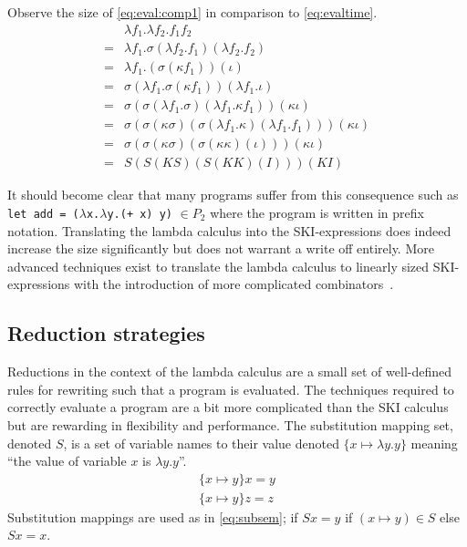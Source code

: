 \documentclass[11pt,oneside,a4paper]{report}
\begin{document}
\begin{exmp}
    Observe the size of \autoref{eq:eval:comp1} in comparison to \autoref{eq:evaltime}.
\begin{align}
    &\lambda f_1 . \lambda f_2 . f_1 f_2 \label{eq:eval:comp1}\\
    =&\lambda f_1 . \sigma(\lambda f_2 . f_1)(\lambda f_2 . f_2) \tag*{} \\
    =&\lambda f_1 . (\sigma(\kappa f_1))(\iota) \tag*{} \\
    =&\sigma (\lambda f_1 . \sigma (\kappa f_1)) (\lambda f_1 . \iota) \tag*{} \\
    =&\sigma (\sigma (\lambda f_1 . \sigma) (\lambda f_1 . \kappa f_1)) (\kappa \iota) \tag*{} \\
    =&\sigma (\sigma (\kappa \sigma) (\sigma (\lambda f_1 . \kappa) (\lambda f_1 . f_1))) (\kappa \iota) \tag*{} \\
    =&\sigma (\sigma (\kappa \sigma) (\sigma (\kappa \kappa) (\iota))) (\kappa \iota) \tag*{} \\
    =&S (S (K S) (S (K K) (I))) (K I) \tag*{}
\end{align}
\end{exmp}
It should become clear that many programs suffer from this consequence such as \texttt{let add = ($\lambda$x.$\lambda$y.(+ x) y)} $\in P_2$ where the program is written in prefix notation.
Translating the lambda calculus into the SKI-expressions does indeed increase the size significantly but does not warrant a write off entirely.
More advanced techniques exist to translate the lambda calculus to linearly sized SKI-expressions with the introduction of more complicated combinators~\cite{kiselyov2018lambda}.

\subsection{Reduction strategies}
Reductions in the context of the lambda calculus are a small set of well-defined rules for rewriting such that a program is evaluated.
The techniques required to correctly evaluate a program are a bit more complicated than the SKI calculus but are rewarding in flexibility and performance.
The substitution mapping set, denoted $S$, is a set of variable names to their value denoted $\{ x \mapsto \lambda y . y \}$ meaning ``the value of variable $x$ is $\lambda y . y$''.
\begin{align}
  \{ x \mapsto y \} x = y\label{eq:subsem}\\
  \{ x \mapsto y \} z = z \tag*{}
\end{align}
Substitution mappings are used as in \autoref{eq:subsem}; if $Sx = y$ if $(x \mapsto y) \in S$ else $Sx = x$.
\end{document}
